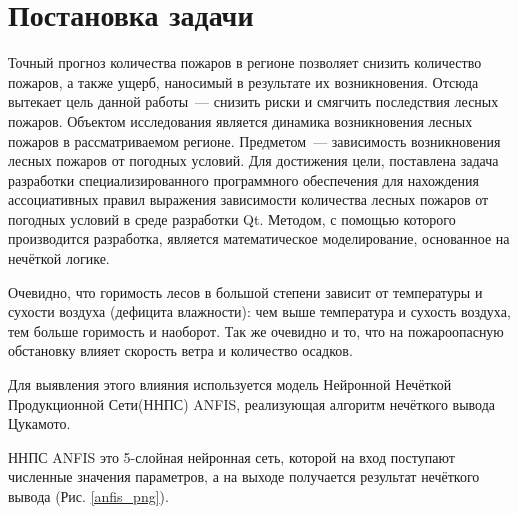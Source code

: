 \documentclass[a4paper,12pt]{article}
\begin{document}
\section{Постановка задачи}
Точный прогноз количества пожаров в регионе позволяет снизить количество пожаров, а также ущерб, наносимый в результате их возникновения. Отсюда вытекает цель данной работы~--- снизить риски и смягчить последствия лесных пожаров. Объектом исследования является динамика возникновения лесных пожаров в рассматриваемом регионе. Предметом~--- зависимость возникновения лесных пожаров от погодных условий. Для достижения цели, поставлена задача разработки специализированного программного обеспечения для нахождения ассоциативных правил выражения зависимости количества лесных пожаров от погодных условий в среде разработки Qt. Методом, с помощью которого производится разработка, является математическое моделирование, основанное на нечёткой логике.

Очевидно, что горимость лесов в большой степени зависит от температуры и сухости воздуха (дефицита влажности): чем выше температура и сухость воздуха, тем больше горимость и наоборот. Так же очевидно и то, что на пожароопасную обстановку влияет скорость ветра и количество осадков.

Для выявления этого влияния используется модель Нейронной Нечёткой Продукционной Сети(ННПС) ANFIS, реализующая алгоритм нечёткого вывода Цукамото.

ННПС ANFIS это 5-слойная нейронная сеть, которой на вход поступают численные значения параметров, а на выходе получается результат нечёткого вывода (Рис. \ref{anfis_png}). 


\begin{center}
\end{center}
\end{document}
